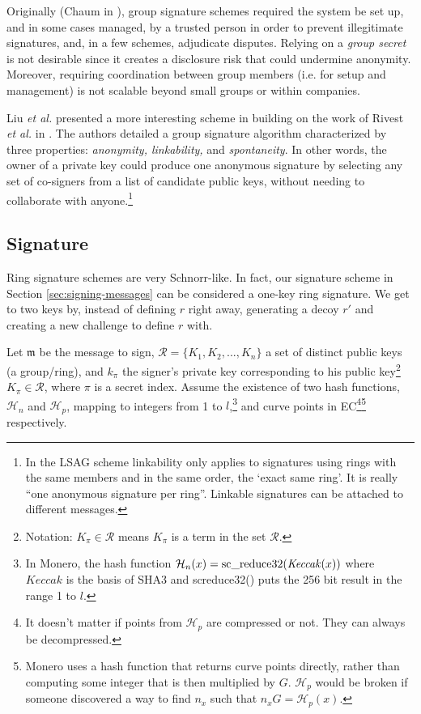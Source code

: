 Originally (Chaum in \cite{Chaum:1991:GS:1754868.1754897}), group signature schemes required the system be set up, and in some cases managed, by a trusted person in order to prevent illegitimate signatures, and, in a few schemes, adjudicate disputes. Relying on a {\em group secret} is not desirable since it creates a disclosure risk that could undermine anonymity. Moreover, requiring coordination between group members (i.e. for setup and management) is not scalable beyond small groups or within companies.

Liu {\em et al.} presented a more interesting scheme in \cite{Liu2004} building on the work of Rivest {\em et al.} in \cite{rivest-leak-secret}. The authors detailed a group signature algorithm characterized by three properties: {\em anonymity, linkability,} and {\em spontaneity}. In other words, the owner of a private key could produce one anonymous signature by selecting any set of co-signers from a list of candidate public keys, without needing to collaborate with anyone.\footnote{\label{lsag_linkability_note}In the LSAG scheme linkability only applies to signatures using rings with the same members and in the same order, the `exact same ring’. It is really ``one anonymous signature per ring”. Linkable signatures can be attached to different messages.}


\subsection*{Signature}

Ring signature schemes are very Schnorr-like. In fact, our signature scheme in Section \ref{sec:signing-messages} can be considered a one-key ring signature. We get to two keys by, instead of defining $r$ right away, generating a decoy $r'$ and creating a new challenge to define $r$ with.

Let \(\mathfrak{m}\) be the message to sign, \(\mathcal{R} = \{K_1, K_2, ..., K_n\}\) a set of distinct public keys (a group/ring), and \(k_\pi\) the signer's private key corresponding to his public key\footnote{\label{notation2_note}Notation: $K_{\pi} \in \mathcal{R}$ means $K_{\pi}$ is a term in the set $\mathcal{R}$.} \(K_\pi \in \mathcal{R}\), where $\pi$ is a secret index. Assume the existence of two hash functions, \(\mathcal{H}_n\) and \(\mathcal{H}_p\),
mapping to integers from 1 to $l$,\footnote{In Monero, the hash function $\mathcal{H}_n(x) = \textrm{sc\textunderscore reduce32}(\mathit{Keccak}(x))$ where $\mathit{Keccak}$ is the basis of SHA3 and sc\textunderscore reduce32() puts the 256 bit result in the range 1 to $l$.} and curve points in EC\footnote{It doesn’t matter if points from $\mathcal{H}_p$ are compressed or not. They can always be decompressed.}\footnote{Monero uses a hash function that returns curve points directly, rather than computing some integer that is then multiplied by $G$. $\mathcal{H}_p$ would be broken if someone discovered a way to find $n_x$ such that $n_x G = \mathcal{H}_p(x)$.} respectively.

